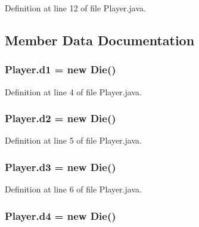 Definition at line 12 of file Player.\-java.



\subsection{Member Data Documentation}
\hypertarget{class_player_a6a844c97ec2c4a8226625b75e612a509}{
\subsubsection[{d1}]{ Player.\-d1 = new {\bf Die}()\hspace{0.3cm}{\ttfamily [package]}}}\label{class_player_a6a844c97ec2c4a8226625b75e612a509}


Definition at line 4 of file Player.\-java.

\hypertarget{class_player_a1c73264f71cfaa2e0530fb0f3bfd4e1e}{
\subsubsection[{d2}]{ Player.\-d2 = new {\bf Die}()\hspace{0.3cm}{\ttfamily [package]}}}\label{class_player_a1c73264f71cfaa2e0530fb0f3bfd4e1e}


Definition at line 5 of file Player.\-java.

\hypertarget{class_player_a541f8c109e7478eba805cb1638007cad}{
\subsubsection[{d3}]{ Player.\-d3 = new {\bf Die}()\hspace{0.3cm}{\ttfamily [package]}}}\label{class_player_a541f8c109e7478eba805cb1638007cad}


Definition at line 6 of file Player.\-java.

\hypertarget{class_player_afe8794243ec655d08fcf9df5691d7fe6}{
\subsubsection[{d4}]{ Player.\-d4 = new {\bf Die}()\hspace{0.3cm}{\ttfamily [package]}}}\label{class_player_afe8794243ec655d08fcf9df5691d7fe6}


